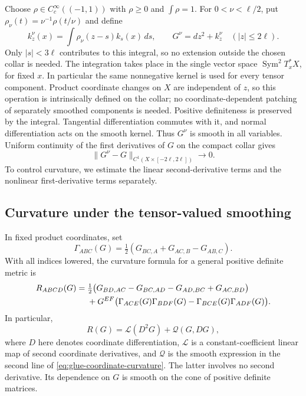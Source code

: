 \documentclass[12pt]{amsart}
\numberwithin{equation}{section}
\theoremstyle{remark}
\begin{document}
Choose \(\rho\in C_c^\infty((-1,1))\) with
\(\rho\ge0\) and \(\int\rho=1\). For \(0<\nu<\ell/2\),
put \(\rho_\nu(t)=\nu^{-1}\rho(t/\nu)\) and define
\begin{equation}\label{eq:glue-tensor-mollifier}
 k_z^\nu(x)=\int\rho_\nu(z-s)k_s(x)\,ds,
 \qquad G^\nu=dz^2+k_z^\nu
 \quad (|z|\le2\ell).
\end{equation}
Only \(|s|<3\ell\) contributes to this integral, so no extension
outside the chosen collar is needed. The integration takes place
in the single vector space
\(\operatorname{Sym}^2T_x^*X\), for fixed \(x\). In
particular the same nonnegative kernel is used for every tensor
component. Product coordinate changes on \(X\) are independent
of \(z\), so this operation is intrinsically defined on the
collar; no coordinate-dependent patching of separately smoothed
components is needed. Positive definiteness is preserved by the
integral. Tangential differentiation commutes with it, and
normal differentiation acts on the smooth kernel. Thus
\(G^\nu\) is smooth in all variables. Uniform continuity of
the first derivatives of \(G\) on the compact collar gives
\begin{equation}\label{eq:glue-C1-convergence}
 \|G^\nu-G\|_{C^1(X\times[-2\ell,2\ell])}\longrightarrow0.
\end{equation}
To control curvature, we estimate the linear second-derivative
terms and the nonlinear first-derivative terms separately.

\subsection{Curvature under the tensor-valued smoothing}
In fixed product coordinates, set
\[
 \Gamma_{ABC}(G)
 =\tfrac12(G_{BC,A}+G_{AC,B}-G_{AB,C}).
\]
With all indices lowered, the curvature formula for a general
positive definite metric is
\begin{align}
 R_{ABCD}(G)={}&\tfrac12\bigl(
 G_{BD,AC}-G_{BC,AD}-G_{AD,BC}+G_{AC,BD}\bigr)\notag\\
 &+G^{EF}\bigl(
 \Gamma_{ACE}(G)\Gamma_{BDF}(G)
 -\Gamma_{BCE}(G)\Gamma_{ADF}(G)\bigr).
 \label{eq:glue-coordinate-curvature}
\end{align}
In particular,
\begin{equation}\label{eq:glue-linear-nonlinear}
 R(G)=\mathcal L(D^2G)+\mathcal Q(G,DG),
\end{equation}
where \(D\) here denotes coordinate differentiation,
\(\mathcal L\) is a constant-coefficient linear map of second
coordinate derivatives, and \(\mathcal Q\) is the smooth
expression in the second line of
\eqref{eq:glue-coordinate-curvature}. The latter involves no
second derivative. Its dependence on \(G\) is smooth on the
cone of positive definite matrices.
\end{document}

